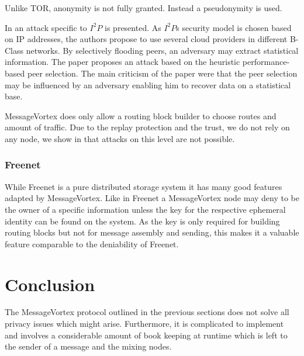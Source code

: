 \documentclass[9pt,journal,compsoc]{IEEEtran}
\begin{document}
Unlike TOR, anonymity is not fully granted. Instead a pseudonymity is used. 

In \cite{pets2011-i2p} an attack specific to $I^2P$ is presented. As $I^2P$s security model is chosen based on IP addresses, the authors propose to use several cloud providers in different B-Class networks. By selectively flooding peers, an adversary may extract statistical information. The paper proposes an attack based on the heuristic performance-based peer selection. The main criticism of the paper were that the peer selection may be influenced by an adversary enabling him to recover data on a statistical base.

MessageVortex does only allow a routing block builder to choose routes and amount of traffic. Due to the replay protection and the trust, we do not rely on any node, we show in \cite{messageVortex} that attacks on this level are not possible.

\subsubsection{Freenet}
%
While Freenet is a pure distributed storage system it has many good features adapted by MessageVortex. Like in Freenet a MessageVortex node may deny to be the owner of a specific information unless the key for the respective ephemeral identity can be found on the system. As the key is only required for building routing blocks but not for message assembly and sending, this makes it a valuable feature comparable to the deniability of Freenet.

\section{Conclusion}
The MessageVortex protocol outlined in the previous sections does not solve all privacy issues which might arise. Furthermore, it is complicated to implement and involves a considerable amount of book keeping at runtime which is left to the sender of a message and the mixing nodes. 
\end{document}
